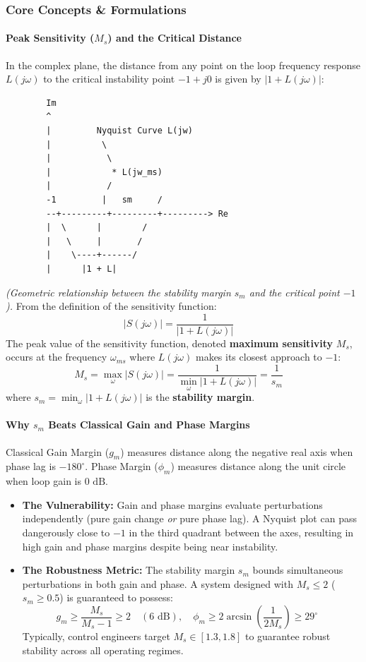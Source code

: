 \documentclass[12pt,onecolumn,twoside ]{article}
\begin{document}
	\subsubsection{Core Concepts \& Formulations}
	\paragraph{Peak Sensitivity ($M_s$) and the Critical Distance}
	In the complex plane, the distance from any point on the loop frequency response $L(j\omega)$ to the critical instability point $-1 + j0$ is given by $|1 + L(j\omega)|$:
	\begin{lstlisting}
		Im
		^
		|         Nyquist Curve L(jw)
		|          \
		|           \
		|            * L(jw_ms)
		|           /
		-1         |   sm     /
		--+---------+---------+---------> Re
		|  \      |        /
		|   \     |       /
		|    \----+------/
		|      |1 + L|
	\end{lstlisting}
	\textit{(Geometric relationship between the stability margin $s_m$ and the critical point $-1$).}
	From the definition of the sensitivity function: \[
	|S(j\omega)| = \frac{1}{|1 + L(j\omega)|} \quad
	\] The peak value of the sensitivity function, denoted \textbf{maximum sensitivity} $M_s$, occurs at the frequency $\omega_{ms}$ where $L(j\omega)$ makes its closest approach to $-1$: \[
	M_s = \max_{\omega} |S(j\omega)| = \frac{1}{\min_{\omega} |1 + L(j\omega)|} = \frac{1}{s_m} \quad
	\]
	where $s_m = \min_\omega |1 + L(j\omega)|$ is the \textbf{stability margin}.
	\paragraph{Why $s_m$ Beats Classical Gain and Phase Margins}
	Classical Gain Margin ($g_m$) measures distance along the negative real axis when phase lag is $-180^\circ$. Phase Margin ($\phi_m$) measures distance along the unit circle when loop gain is $0\text{ dB}$.
	\begin{itemize}
		\item
		\textbf{The Vulnerability:} Gain and phase margins evaluate perturbations independently (pure gain change \textit{or} pure phase lag). A Nyquist plot can pass dangerously close to $-1$ in the third quadrant between the axes, resulting in high gain and phase margins despite being near instability.
		\item
		\textbf{The Robustness Metric:} The stability margin $s_m$ bounds simultaneous perturbations in both gain and phase. A system designed with $M_s \le 2$ ($s_m \ge 0.5$) is guaranteed to possess: \[
		g_m \ge \frac{M_s}{M_s - 1} \ge 2 \quad (6\text{ dB}), \quad \phi_m \ge 2\arcsin\left(\frac{1}{2M_s}\right) \ge 29^\circ \quad
		\] Typically, control engineers target $M_s \in [1.3, 1.8]$ to guarantee robust stability across all operating regimes.
	\end{itemize}
	
\end{document}
